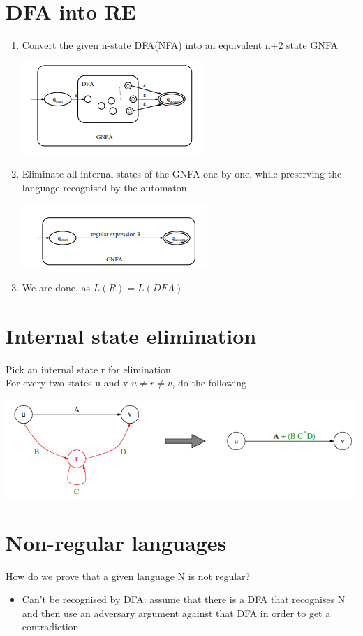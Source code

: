 \documentclass{article}[18pt]
\begin{document}
\section{DFA into RE}
\begin{enumerate}
	\item Convert the given n-state DFA(NFA) into an equivalent n+2 state GNFA
	\begin{center}
		\includegraphics[scale=0.7]{DFA_to_RE}
	\end{center}
	\item Eliminate all internal states of the GNFA one by one, while preserving the language recognised by the automaton
	\begin{center}
		\includegraphics[scale=0.7]{DFA_to_RE1}
	\end{center}
	\item We are done, as $L(R)=L(DFA)$
\end{enumerate}
\section{Internal state elimination}
Pick an internal state r for elimination\\
For every two states u and v $u\neq r\neq v$, do the following
\begin{center}
	\includegraphics[scale=0.7]{Elimination}
\end{center}
\section{Non-regular languages}
How do we prove that a given language N is not regular?
\begin{itemize}
	\item Can't be recognised by DFA: assume that there is a DFA that recognises N and then use an adversary argument against that DFA in order to get a contradiction
\end{itemize}
\end{document}

